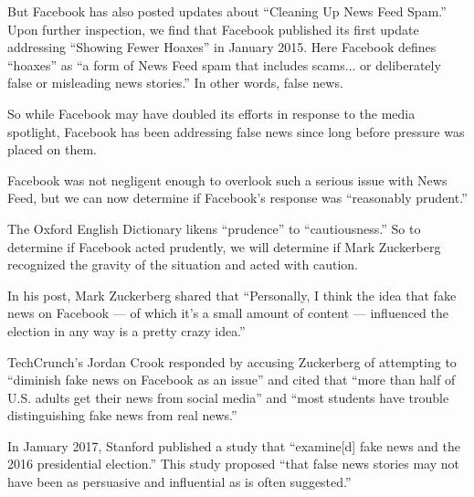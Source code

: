 \par But Facebook has also posted updates about ``Cleaning Up News Feed Spam.'' \cite{fb_newsroom} Upon further inspection, we find that Facebook published its first update addressing ``Showing Fewer Hoaxes'' in January 2015. \cite{fb_hoaxes_2015} Here Facebook defines ``hoaxes'' as ``a form of News Feed spam that includes scams... or deliberately false or misleading news stories.'' \cite{fb_hoaxes_2015} In other words, false news.

\par So while Facebook may have doubled its efforts in response to the media spotlight, \cite{guardian_steps }Facebook has been addressing false news since long before pressure was placed on them.

\par Facebook was not negligent enough to overlook such a serious issue with News Feed, but we can now determine if Facebook's response was ``reasonably prudent.''


\par The Oxford English Dictionary likens ``prudence'' to ``cautiousness.'' \cite{oxford} So to determine if Facebook acted prudently, we will determine if Mark Zuckerberg recognized the gravity of the situation and acted with caution.

\par In his post, Mark Zuckerberg shared that ``Personally, I think the idea that fake news on Facebook — of which it's a small amount of content — influenced the election in any way is a pretty crazy idea.'' \cite{zuck_resp_a}

\par TechCrunch's Jordan Crook responded by accusing Zuckerberg of attempting to ``diminish fake news on Facebook as an issue'' \cite{tc_responsibility} and cited that ``more than half of U.S. adults get their news from social media'' \cite{tc_responsibility} and ``most students have trouble distinguishing fake news from real news.'' \cite{tc_responsibility}

\par In January 2017, Stanford published a study that ``examine[d] fake news and the 2016 presidential election.'' \cite{stanford_election} This study proposed ``that false news stories may not have been as persuasive and influential as is often suggested.'' \cite{stanford_election}

